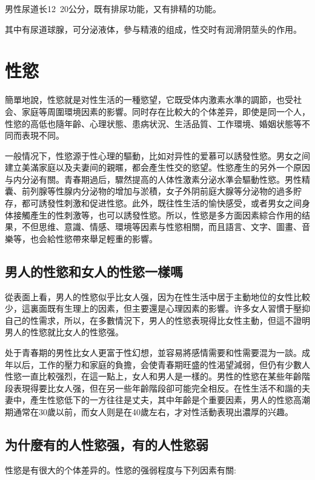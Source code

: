 \documentclass[12pt,UTF8]{ctexbook}
\begin{document}
男性尿道长12~20公分，既有排尿功能，又有排精的功能。

其中有尿道球腺，可分泌液体，參与精液的组成，性交时有润滑阴莖头的作用。

\chapter{性慾}

簡單地說，性慾就是对性生活的一種慾望，它既受体内激素水準的調節，也受社会、家庭等周圍環境因素的影響。同时存在比較大的个体差异，即使是同一个人，性慾的高低也隨年齡、心理状態、患病状況、生活品質、工作環境、婚姻状態等不同而表現不同。

一般情况下，性慾源于性心理的驅動，比如对异性的爱慕可以誘發性慾。男女之间建立美滿家庭以及夫妻间的親暱，都会產生性交的慾望。性慾產生的另外一个原因与内分泌有關。青春期過后，驟然提高的人体性激素分泌水準会驅動性慾。男性精囊、前列腺等性腺内分泌物的增加与淤積，女子外阴前庭大腺等分泌物的過多貯存，都可誘發性刺激和促进性慾。此外，既往性生活的愉快感受，或者男女之间身体接觸產生的性刺激等，也可以誘發性慾。所以，性慾是多方面因素綜合作用的结果，不但思维、意識、情感、環境等因素与性慾相關，而且語言、文字、圖畫、音樂等，也会給性慾帶來舉足輕重的影響。

\section{男人的性慾和女人的性慾一樣嗎}

從表面上看，男人的性慾似乎比女人强，因为在性生活中居于主動地位的女性比較少，這裏面既有生理上的因素，但主要還是心理因素的影響。许多女人習慣于壓抑自己的性需求，所以，在多數情況下，男人的性慾表現得比女性主動，但這不證明男人的性慾就比女人的性慾强。

处于青春期的男性比女人更富于性幻想，並容易將感情需要和性需要混为一談。成年以后，工作的壓力和家庭的負擔，会使青春期旺盛的性渴望減弱，但仍有少數人性慾一直比較强烈，在這一點上，女人和男人是一樣的。男性的性慾在某些年齡階段表現得要比女人强，但在另一些年齡階段卻可能完全相反。在性生活不和諧的夫妻中，產生性慾低下的一方往往是丈夫，其中年齡是个重要因素，男人的性慾高潮期通常在30歲以前，而女人则是在40歲左右，才对性活動表現出濃厚的兴趣。

\section{为什麼有的人性慾强，有的人性慾弱}

性慾是有很大的个体差异的。性慾的强弱程度与下列因素有關:
\end{document}
